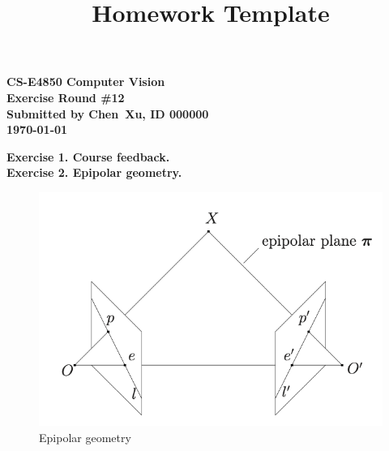 \documentclass[letterpaper, 11pt]{article}
\begin{document}
\title{Homework Template}

\begin{center}
    {
        \large
        \bf
        CS-E4850 Computer Vision\\
        Exercise Round \#12\\
        Submitted by Chen\ Xu, ID 000000\\
        \today
    }
\end{center}
\bigskip
\textbf{Exercise 1. Course feedback.}\\
\textbf{Exercise 2. Epipolar geometry.}


\begin{figure}[H]
    \centering
    \includegraphics[width=0.6\columnwidth]{EpipolarGeometry.png}
    \caption{Epipolar geometry}
    \label{fig:epi_geo}
\end{figure}
\end{document}
